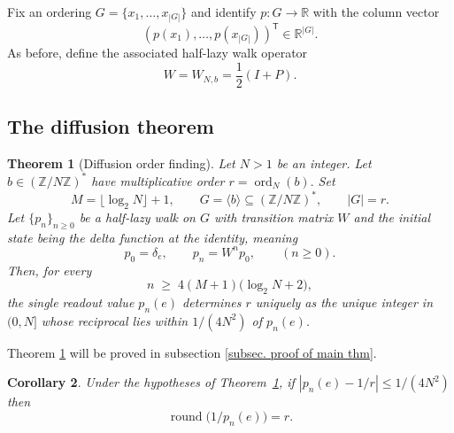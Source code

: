 \documentclass[11pt,reqno]{article}
\numberwithin{equation}{section}
\DeclareMathOperator{\ord}{ord}
\theoremstyle{plain}
\newtheorem{theorem}{Theorem}[section]
\newtheorem{corollary}[theorem]{Corollary}
\theoremstyle{definition}
\theoremstyle{remark}
\newcommand{\R}{\mathbb{R}}
\newcommand{\Z}{\mathbb{Z}}
\begin{document}
Fix an ordering $G=\{x_1,\dots,x_{|G|}\}$ and identify $p:G\to\R$ with the column vector
$$(p(x_1),\dots,p(x_{|G|}))^{\mathsf T}\in\R^{|G|}.$$
As before, define the associated half-lazy walk operator
\[
  W=W_{N,b}=\frac12(I+P).
\]

\subsection{The diffusion theorem}

\begin{theorem}[Diffusion order finding]\label{thm:main}
Let $N>1$ be an integer.
Let $b\in(\Z/N\Z)^\ast$ have multiplicative order $r=\ord_N(b).$
Set
\[
  M=\lfloor\log_2 N\rfloor+1,
  \qquad
  G=\langle b\rangle\subseteq (\Z/N\Z)^\ast,
  \qquad |G|=r.
\]
 Let $\{p_n\}_{n\geq 0}$ be a half-lazy walk on $G$ with  transition matrix $W$ and the initial state being the delta function at the identity,
 meaning
\[
  p_0=\delta_e,
  \qquad
  p_n= W^n p_0, \qquad (n\ge 0).
\]
\smallskip
\noindent Then, for every
\begin{equation}\label{eq:diffusion_bound}
  n \;\ge\; 4(M+1)\bigl(\log_2 N + 2\bigr),
\end{equation}
the single readout value $p_n(e)$ determines $r$ uniquely as the unique integer in $(0,N]$
whose reciprocal lies within $1/(4N^2)$ of $p_n(e)$.
\end{theorem}

Theorem \ref{thm:main} will be proved in subsection \ref{subsec. proof of main thm}.

\begin{corollary}\label{cor:rounding-rule}
Under the hypotheses of Theorem~\ref{thm:main}, if $|p_n(e)-1/r|\le 1/(4N^2)$ then
\[
\operatorname{round}\!\bigl(1/p_n(e)\bigr)=r.
\]
\end{corollary}
\end{document}
